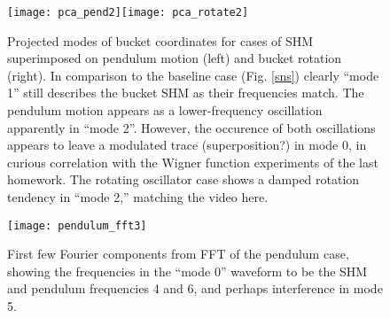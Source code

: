 \documentclass{article}
\begin{document}
\begin{figure}[h]
  \centering
  \texttt{[image: pca\_pend2]}\texttt{[image: pca\_rotate2]}
  \caption{Projected modes of bucket coordinates for cases of SHM superimposed on pendulum motion (left) and bucket rotation (right). In comparison to the baseline case (Fig. \ref{sns}) clearly ``mode 1'' still describes the bucket SHM as their frequencies match. The pendulum motion appears as a lower-frequency oscillation apparently in ``mode 2''. However, the occurence of both oscillations appears to leave a modulated trace (superposition?) in mode 0, in curious correlation with the Wigner function experiments of the last homework. The rotating oscillator case shows a damped rotation tendency in ``mode 2,'' matching the video here.}\label{pr}
\end{figure}

\begin{figure}[hb!]
  \centering
  \texttt{[image: pendulum\_fft3]}
  \caption{First few Fourier components from FFT of the pendulum case, showing the frequencies in the ``mode 0'' waveform to be the SHM and pendulum frequencies 4 and 6, and perhaps interference in mode 5.}\label{pend_fft}
\end{figure}

\end{document}
